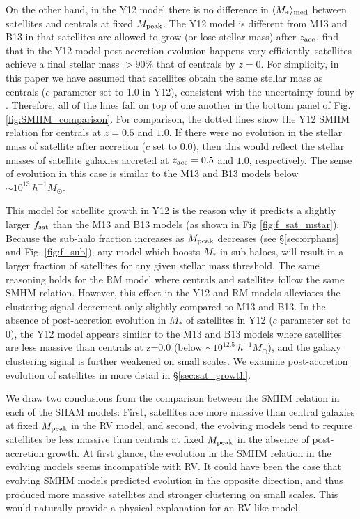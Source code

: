 \documentclass[useAMS,fleqn,usenatbib]{mnras}
\begin{document}
On the other hand, in the Y12 model there is no difference in $\langle M_*\rangle_{\rm med}$ between satellites and centrals at fixed $M_{\rm peak}$.  The Y12 model is different from M13 and B13 in that satellites are allowed to grow (or lose stellar mass) after $z_{\rm acc}$.  \citet{Yang:2012ew} find that in the Y12 model post-accretion evolution happens very efficiently--satellites achieve a final stellar mass $> 90\%$ that of centrals by $z=0$.  For simplicity, in this paper we have assumed that satellites obtain the same stellar mass as centrals ($c$ parameter set to 1.0 in Y12), consistent with the uncertainty found by \citet{Yang:2012ew}.  Therefore, all of the lines fall on top of one another in the bottom panel of Fig. \ref{fig:SMHM_comparison}.  For comparison, the dotted lines show the Y12 SMHM relation for centrals at $z=0.5$ and $1.0$. If there were no evolution in the stellar mass of satellite after accretion ($c$ set to $0.0$), then this would reflect the
stellar masses of satellite galaxies accreted at $z_{\rm acc} = 0.5$
and $1.0$, respectively. The sense of evolution in this case is similar to the M13 and B13 models below $\sim 10^{13}~h^{-1}M_{\odot}$.

This model for satellite growth in Y12 is the reason why it predicts a slightly larger $f_{\rm sat}$ than the M13 and B13 models (as shown in Fig \ref{fig:f_sat_mstar}).  Because the sub-halo fraction increases as $M_{\rm peak}$ decreases (see \S \ref{sec:orphans} and Fig. \ref{fig:f_sub}), any model which boosts $M_*$ in sub-haloes, will result in a larger fraction of satellites for any given stellar mass threshold.  The same reasoning holds for the RM model where centrals and satellites follow the same SMHM relation.  However, this effect in the Y12 and RM models alleviates the clustering signal decrement only slightly compared to M13 and B13.  In the absence of post-accretion evolution in $M_*$ of satellites in Y12 ($c$ parameter set to 0), the Y12 model appears similar to the M13 and B13 models where satellites are less massive than centrals at z=0.0 (below $\sim 10^{12.5} ~ h^{-1} M_{\odot}$), and the galaxy clustering signal is further weakened on small scales.  We examine post-accretion evolution of satellites in more detail in \S \ref{sec:sat_growth}.

We draw two conclusions from the comparison between the SMHM relation in each of the SHAM models: First, satellites are more massive than central galaxies at fixed $M_{\rm peak}$ in the RV model, and second, the evolving models tend to require satellites be less massive than centrals at fixed $M_{\rm peak}$ in the absence of post-accretion growth.  At first glance, the evolution in the SMHM relation in the evolving models seems incompatible with RV.  It could have been the case that evolving SMHM models predicted evolution in the opposite direction, and thus produced more massive satellites and stronger clustering on small scales.  This would naturally provide a physical explanation for an RV-like model.
\end{document}
